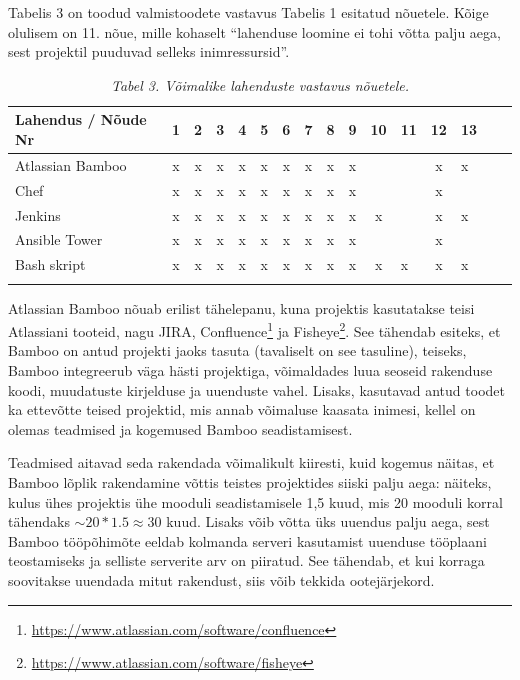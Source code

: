 \documentclass[12pt]{article}
\begin{document}
  Tabelis 3 on toodud valmistoodete vastavus Tabelis 1 esitatud nõuetele. Kõige olulisem on 11. nõue, mille kohaselt ``lahenduse loomine ei tohi võtta palju aega, sest projektil puuduvad selleks inimressursid''.
  
  \begin{table}[H]
    \caption*{\textit{Tabel 3. Võimalike lahenduste vastavus nõuetele.}}
    
    \begin{tabular}{ |l|c|c|c|c|c|c|c|c|c|c V{4} c V{4} c|c| }
      \hline
      \textbf{Lahendus / Nõude Nr} & \textbf{1} & \textbf{2} & \textbf{3} & \textbf{4} & \textbf{5} & \textbf{6} & \textbf{7} & \textbf{8} & \textbf{9} & \textbf{10} & \textbf{11} & \textbf{12} & \textbf{13}\\
      \hline
      Atlassian Bamboo & x & x & x & x & x & x & x & x & x & & & x & x\\
      \hline
      Chef & x & x & x & x & x & x & x & x & x & & & x &\\
      \hline
      Jenkins & x & x & x & x & x & x & x & x & x & x & & x & x\\
      \hline
      Ansible Tower & x & x & x & x & x & x & x & x & x & & & x & \\
      \hline
      Bash skript & x & x & x & x & x & x & x & x & x & x & x & x & x\\
      \hline
    \end{tabular}
  \end{table}

  Atlassian Bamboo nõuab erilist tähelepanu, kuna projektis kasutatakse teisi Atlassiani tooteid, nagu JIRA, Confluence\footnote{\url{https://www.atlassian.com/software/confluence}} ja Fisheye\footnote{\url{https://www.atlassian.com/software/fisheye}}. See tähendab esiteks, et Bamboo on antud projekti jaoks tasuta (tavaliselt on see tasuline), teiseks, Bamboo integreerub väga hästi projektiga, võimaldades luua seoseid rakenduse koodi, muudatuste kirjelduse ja uuenduste vahel. Lisaks, kasutavad antud toodet ka ettevõtte teised projektid, mis annab võimaluse kaasata inimesi, kellel on olemas teadmised ja kogemused Bamboo seadistamisest.
  
  Teadmised aitavad seda rakendada võimalikult kiiresti, kuid kogemus näitas, et Bamboo lõplik rakendamine võttis teistes projektides siiski palju aega: näiteks, kulus ühes projektis ühe mooduli seadistamisele 1,5 kuud, mis 20 mooduli korral tähendaks $\sim20*1.5 \approx 30$ kuud. Lisaks võib võtta üks uuendus palju aega, sest Bamboo tööpõhimõte eeldab kolmanda serveri kasutamist uuenduse tööplaani teostamiseks ja selliste serverite arv on piiratud. See tähendab, et kui korraga soovitakse uuendada mitut rakendust, siis võib tekkida ootejärjekord.
  
\end{document}

